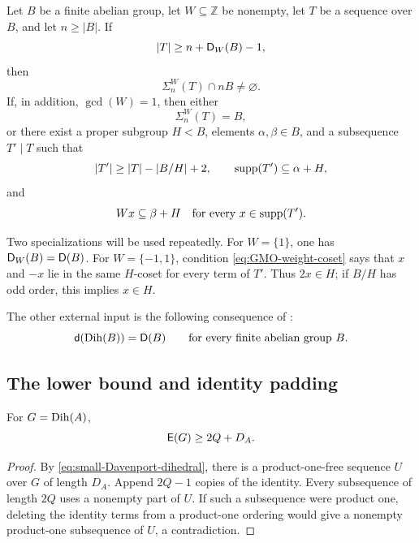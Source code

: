\begin{theorem}\label{thm:GMO}
Let \(B\) be a finite abelian group, let \(W\subseteq\mathbb Z\) be
nonempty, let \(T\) be a sequence over \(B\), and let \(n\ge |B|\).
If
\[
  |T|\ge n+\mathsf D_W(B)-1,
\]
then
\begin{equation}\label{eq:GMO-existence}
  \Sigma_n^W(T)\cap nB\ne\varnothing.
\end{equation}
If, in addition, \(\gcd(W)=1\), then either
\begin{equation}\label{eq:GMO-full}
  \Sigma_n^W(T)=B,
\end{equation}
or there exist a proper subgroup \(H<B\), elements
\(\alpha,\beta\in B\), and a subsequence \(T'\mid T\) such that
\begin{equation}\label{eq:GMO-concentration}
  |T'|\ge |T|-|B/H|+2,
  \qquad
  \operatorname{supp}(T')\subseteq \alpha+H,
\end{equation}
and
\begin{equation}\label{eq:GMO-weight-coset}
  W x\subseteq\beta+H
  \quad\text{for every }x\in\operatorname{supp}(T').
\end{equation}
\end{theorem}

Two specializations will be used repeatedly. For \(W=\{1\}\), one has
\(\mathsf D_W(B)=\mathsf D(B)\). For \(W=\{-1,1\}\), condition
\eqref{eq:GMO-weight-coset} says that \(x\) and \(-x\) lie in the same
\(H\)-coset for every term of \(T'\). Thus \(2x\in H\); if \(B/H\)
has odd order, this implies \(x\in H\).

The other external input is the following consequence of
\cite[Theorem 1.1]{GodaraJoshiMazumdar2026}:
\begin{equation}\label{eq:small-Davenport-dihedral}
  \mathsf d(\operatorname{Dih}(B))=\mathsf D(B)
  \qquad\text{for every finite abelian group }B.
\end{equation}

\subsection{The lower bound and identity padding}

\begin{proposition}\label{prop:lower-bound}
For \(G=\operatorname{Dih}(A)\),
\[
  \mathsf E(G)\ge 2Q+D_A.
\]
\end{proposition}

\begin{proof}
By \eqref{eq:small-Davenport-dihedral}, there is a product-one-free
sequence \(U\) over \(G\) of length \(D_A\). Append \(2Q-1\) copies
of the identity. Every subsequence of length \(2Q\) uses a nonempty
part of \(U\). If such a subsequence were product one, deleting the
identity terms from a product-one ordering would give a nonempty
product-one subsequence of \(U\), a contradiction.
\end{proof}

